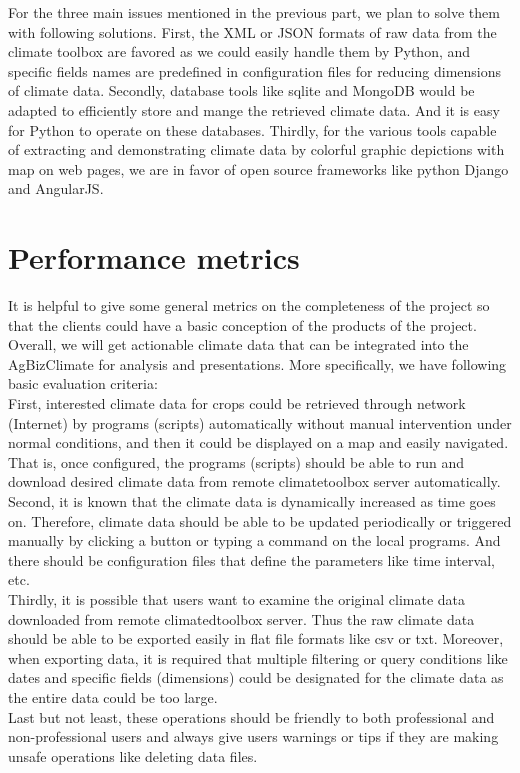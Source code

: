 \documentclass[letterpaper,10pt]{article}
\begin{document}
   For the three main issues mentioned in the previous part, we plan to solve them with following solutions. First, the XML or JSON formats of raw data from the climate toolbox are favored as we could easily handle them by Python, and specific fields names are predefined in configuration files for reducing dimensions of climate data. Secondly, database tools like sqlite and MongoDB would be adapted to efficiently store and mange the retrieved climate data. And it is easy for Python to operate on these databases. Thirdly, for the various tools capable of extracting and demonstrating climate data by colorful graphic depictions with map on web pages, we are in favor of open source frameworks like python Django and AngularJS.

	  \section*{Performance metrics}
    It is helpful to give some general metrics on the completeness of the project so that the clients could have a basic conception of the products of the project. Overall, we will get actionable climate data that can be integrated into the AgBizClimate for analysis and presentations. More specifically, we have following basic evaluation criteria:\\

    First, interested climate data for crops could be retrieved through network (Internet) by programs (scripts) automatically without manual intervention under normal conditions, and then it could be displayed on a map and easily navigated. That is, once configured, the programs (scripts) should be able to run and download desired climate data from remote climatetoolbox server automatically.\\

    Second, it is known that the climate data is dynamically increased as time goes on. Therefore, climate data should be able to be updated periodically or triggered manually by clicking a button or typing a command on the local programs. And there should be configuration files that define the parameters like time interval, etc.\\

    Thirdly, it is possible that users want to examine the original climate data downloaded from remote climatedtoolbox server. Thus the raw climate data should be able to be exported easily in flat file formats like csv or txt. Moreover, when exporting data, it is required that multiple filtering or query conditions like dates and specific fields (dimensions) could be designated for the climate data as the entire data could be too large.\\

    Last but not least, these operations should be friendly to both professional and non-professional users and always give users warnings or tips if they are making unsafe operations like deleting data files.
\end{document}
